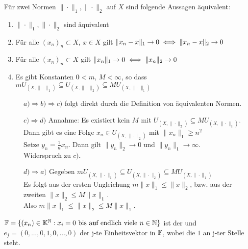 \begin{prop} \label{prop:2.7}
	Für zwei Normen $\| \cdot \|_{1}, \| \cdot \|_{2}$ auf $X$ sind folgende Aussagen äquivalent:
	\begin{enumerate}[label=\alph*\upshape)]
		\item $\| \cdot \|_{1}, \| \cdot \|_{2}$ sind äquivalent
		\item Für alle $(x_{n})_{n} \subset X$, $x \in X$ gilt $\| x_{n} - x \|_{1} \rightarrow 0 \iff \| x_{n} - x \|_{2} \rightarrow 0 $
		\item Für alle $(x_{n})_{n} \subset X$ gilt $\| x_{n} \|_{1} \rightarrow 0 \iff \| x_{n} \|_{2} \rightarrow 0 $
		\item Es gibt Konstanten $0 < m$, $M < \infty$, so dass $m U_{(X, \| \cdot \|_{1})} \subseteq U_{(X, \| \cdot \|_{2})} \subseteq M U_{(X, \| \cdot \|_{1})}$
	\end{enumerate}
	\begin{beweis}
		\begin{description}
			\item[] $a) \Rightarrow b) \Rightarrow c)$ folgt direkt durch die Definition von äquivalenten Normen. 
  			\item[] $c) \Rightarrow d)$ Annahme: Es existiert kein $M$ mit $U_{(X, \| \cdot \|_{2})} \subseteq M U_{(X, \| \cdot \|_{1})}$. \\
  				Dann gibt es eine Folge $x_{n} \in U_{(X, \| \cdot \|_{2})}$ mit $\| x_{n} \|_{1} \geq n^{2}$ \\
  				Setze $y_{n} =  \frac{1}{n} x_{n}$. Dann gilt $\| y_{n} \|_{2} \rightarrow 0$ und $\| y_{n} \|_{1} \rightarrow \infty$. \\
  				Widerspruch zu $c)$.
  			 \item[] $d) \Rightarrow a)$ Gegeben $m U_{(X, \| \cdot \|_{1})} \subseteq U_{(X, \| \cdot \|_{2})} \subseteq M U_{(X, \| \cdot \|_{1})}$ \\
  			 Es folgt aus der ersten Ungleichung  $m \| x \|_{1} \leq \| x \|_{2}$, bzw. aus der zweiten $\| x \|_{2} \leq M \| x \|_{1}$. \\
  			 Also $m \| x \|_{1} \leq \| x \|_{2} \leq M \| x \|_{1}$. 
		\end{description}
	\end{beweis}
\end{prop}


\begin{vereinbarung}
	$\mathbb{F} = \{ (x_{n}) \in \mathbb{K}^{\mathbb{N}}: x_{i} = 0 \text{ bis auf endlich viele } n \in \mathbb{N} \} $ ist der  und $e_{j} = (0, \dotsc, 0, 1, 0, \dotsc, 0) $ der j-te Einheitsvektor in $\mathbb{F}$, wobei die $1$ an j-ter Stelle steht.
\end{vereinbarung}


